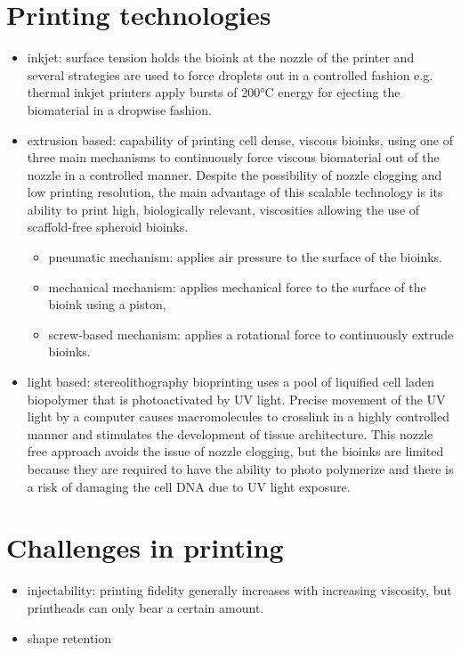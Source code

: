 \section{Printing technologies}
\begin{itemize}
\item inkjet: surface tension holds the bioink at the nozzle of the printer and several strategies are used to force droplets out in a controlled fashion e.g. thermal inkjet printers apply bursts of 200°C energy for ejecting the biomaterial in a dropwise fashion.
\item extrusion based:  capability of printing cell dense, viscous bioinks, using one of three main mechanisms to continuously force viscous biomaterial out of the nozzle in a controlled manner. Despite the possibility of nozzle clogging and low printing resolution, the main advantage of this scalable technology is its ability to print high, biologically relevant, viscosities allowing the use of scaffold-free spheroid bioinks.
\begin{itemize}
	\item pneumatic mechanism: applies air pressure to the surface of the bioinks. 
	\item mechanical mechanism: applies mechanical force to the surface of the bioink using a piston,
	\item screw-based mechanism: applies a rotational force to continuously extrude bioinks. 
\end{itemize}
\item light based: stereolithography bioprinting uses a pool of liquified cell laden biopolymer that is photoactivated by UV light. Precise movement of the UV light by a computer causes macromolecules to crosslink in a highly controlled manner and stimulates the development of tissue architecture. This nozzle free approach avoids the issue of nozzle clogging, but the bioinks are limited because they are required to have the ability to photo polymerize and there is a risk of damaging the cell DNA due to UV light exposure.
\end{itemize}

\section{Challenges in printing}
\begin{itemize}
\item injectability: printing fidelity generally increases with increasing viscosity, but printheads can only bear a certain amount.
\item shape retention
\end{itemize}


